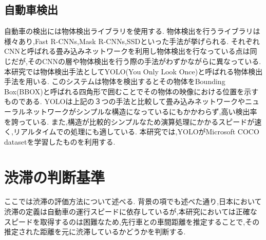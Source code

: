 \subsection{自動車検出}
自動車の検出には物体検出ライブラリを使用する.
物体検出を行うライブラリは様々あり,Fast R-CNNs,Mask R-CNNs,SSDといった手法が挙げられる.
それぞれCNNと呼ばれる畳み込みネットワークを利用し物体検出を行なっている点は同じだが,そのCNNの層や物体検出を行う際の手法がわずかながらに異なっている.
本研究では物体検出手法としてYOLO(You Only Look Once)と呼ばれる物体検出手法を用いる.
このシステムは物体を検出するとその物体をBounding Box(BBOX)と呼ばれる四角形で囲むことでその物体の映像における位置を示すものである.
YOLOは上記の３つの手法と比較して畳み込みネットワークやニューラルネットワークがシンプルな構造になっているにもかかわらず,高い検出率を誇っている.
また,構造が比較的シンプルなため演算処理にかかるスピードが速く,リアルタイムでの処理にも適している.
本研究では,YOLOがMicrosoft COCO datasetを学習したものを利用する.


\section{渋滞の判断基準}
ここでは渋滞の評価方法について述べる.
背景の項でも述べた通り,日本において渋滞の定義は自動車の運行スピードに依存しているが,本研究においては正確なスピードを取得するのは困難なため,先行車との車間距離を推定することで,その推定された距離を元に渋滞しているかどうかを判断する.

